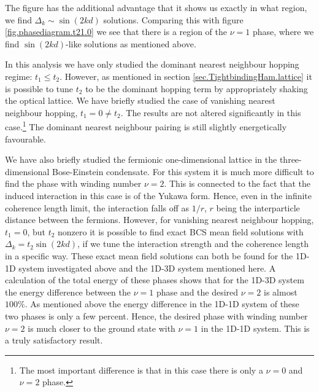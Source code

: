 The figure has the additional advantage that it shows us exactly in what region, we find $\Delta_k \sim \sin(2kd)$ solutions. Comparing this with figure \ref{fig.phasediagram.t21.0} we see that there is a region of the $\nu = 1$ phase, where we find $\sin(2kd)$-like solutions as mentioned above. 

In this analysis we have only studied the dominant nearest neighbour hopping regime: $t_1 \leq t_2$. However, as mentioned in section \ref{sec.TightbindingHam.lattice} it is possible to tune $t_2$ to be the dominant hopping term by appropriately shaking the optical lattice. We have briefly studied the case of vanishing nearest neighbour hopping, $t_1 = 0 \neq t_2$. The results are not altered significantly in this case.\footnote{The most important difference is that in this case there is only a $\nu = 0$ and $\nu = 2$ phase.} The dominant nearest neighbour pairing is still slightly energetically favourable.

We have also briefly studied the fermionic one-dimensional lattice in the three-dimensional Bose-Einstein condensate. For this system it is much more difficult to find the phase with winding number $\nu = 2$. This is connected to the fact that the induced interaction in this case is of the Yukawa form. Hence, even in the infinite coherence length limit, the interaction falls off as $1 / r$, $r$ being the interparticle distance between the fermions. However, for vanishing nearest neighbour hopping, $t_1 = 0$, but $t_2$ nonzero it is possible to find exact BCS mean field solutions with $\Delta_k = t_2\sin(2kd)$, if we tune the interaction strength and the coherence length in a specific way. These exact mean field solutions can both be found for the 1D-1D system investigated above and the 1D-3D system mentioned here. A calculation of the total energy of these phases shows that for the 1D-3D system the energy difference between the $\nu = 1$ phase and the desired $\nu = 2$ is almost $100 \%$. As mentioned above the energy difference in the 1D-1D system of these two phases is only a few percent. Hence, the desired phase with winding number $\nu = 2$ is much closer to the ground state with $\nu = 1$ in the 1D-1D system. This is a truly satisfactory result. 



